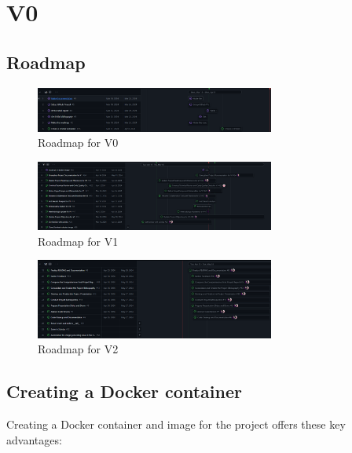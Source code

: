 \documentclass[12pt]{article}
\begin{document}
 


\newpage
\section{V0}
\subsection{Roadmap}
\begin{figure}[H]
    \centering
    \includegraphics[width=0.7\textwidth]{images/roadmapV0.png}
    \caption{Roadmap for V0}
\end{figure}

\begin{figure}[H]
    \centering
    \includegraphics[width=0.7\textwidth]{images/roadmapV1.png}
    \caption{Roadmap for V1}
\end{figure}

\begin{figure}[H]
    \centering
    \includegraphics[width=0.7\textwidth]{images/roadmapV2.png}
    \caption{Roadmap for V2}
\end{figure}

\newpage 

\subsection{Creating a Docker container}
Creating a Docker container and image for the project offers these key advantages:
\end{document}
